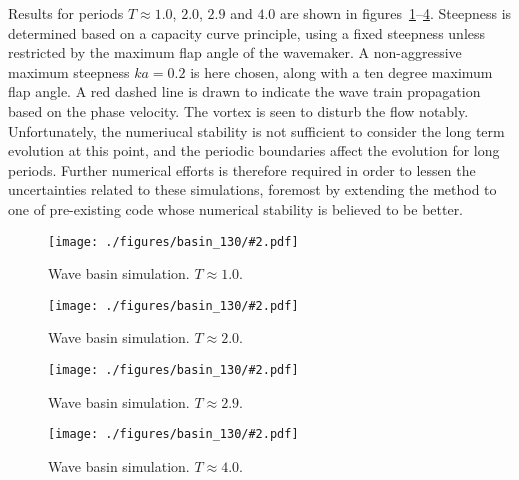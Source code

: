 \documentclass[a4paper,12pt]{article}
\renewcommand{\_}[1]{_\mr{#1}}
\begin{document}
Results for periods $T\approx 1.0$, $2.0$, $2.9$ and $4.0$ are shown in figures~\ref{fig:basinSimT1.0}--\ref{fig:basinSimT4.0}.
Steepness is determined based on a capacity curve principle, using a fixed steepness unless restricted by the maximum flap angle of the wavemaker. 
A non-aggressive maximum steepness $ka=0.2$ is here chosen, along with a ten degree maximum flap angle.
A red dashed line is drawn to indicate the wave train propagation based on the phase velocity.
The vortex is seen to disturb the flow notably.
Unfortunately, the numeriucal stability is not sufficient to consider the long term evolution at this point, and the periodic boundaries affect the evolution for long periods.
Further numerical efforts is therefore required in order to lessen the uncertainties related to these simulations, foremost by extending the method to one of pre-existing code whose numerical stability is believed to be better.

\newcommand{\basinPlot}[2]{
\begin{figure}[h!ptb]%
\centering
\texttt{[image: ./figures/basin\_L130/\#2.pdf]}%
\caption{Wave basin simulation. $T\approx#1$.}%
\label{fig:basinSimT#1}
\end{figure}
}
\basinPlot{1.0}{T1p0_ka0p2_M5_Nw69_dt5T_L130_rePlot}
\basinPlot{2.0}{T2p0_ka0p2_M5_Nw19_dt5T_L130_rePlot}
\basinPlot{2.9}{T2p9_ka0p2_M5_Nw9_dt5T_L130_rePlot}
\basinPlot{4.0}{T4p0_ka0p073_M5_Nw5_dt5T_L130_rePlot}

\end{document}
